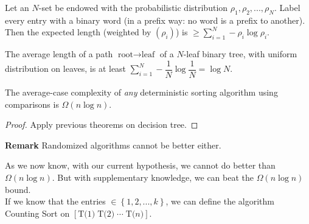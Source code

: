 \begin{theorem}[Shannon 1948]
Let an $N$-set be endowed with the probabilistic distribution $\rho_1, \rho_2,..., \rho_N$. Label every entry with a binary word (in a prefix way: no word is a prefix to another). Then the expected length (weighted by $(\rho_i)$) is $\geq \sum_{i=1}^{N} -\rho_i \log \rho_i$. 
\end{theorem}
\begin{theorem}
The average length of a path $\text{root} \rightarrow \text{leaf}$ of a $N$-leaf binary tree, with uniform distribution on leaves, is at least $\sum_{i=1}^N -\dfrac{1}{N} \log \dfrac{1}{N} = \log N$.
\end{theorem}
\begin{theorem}
The average-case complexity of \emph{any} deterministic sorting algorithm using comparisons is $\Omega (n\log n)$.
\end{theorem}
\begin{proof}
Apply previous theorems on decision tree.
\QED
\end{proof}

\textbf{Remark} Randomized algorithms cannot be better either.

As we now know, with our current hypothesis, we cannot do better than $\Omega (n\log n)$. But with supplementary knowledge, we can beat the $\Omega (n\log n)$ bound.\\

If we know that the entries $\in \left\{ 1,2,...,k \right\}$, we can define the algorithm Counting Sort on $\left[ \text{T(1)} \; \text{T(2)} \; \cdots \; \text{T(}n\text{)} \right]$.


